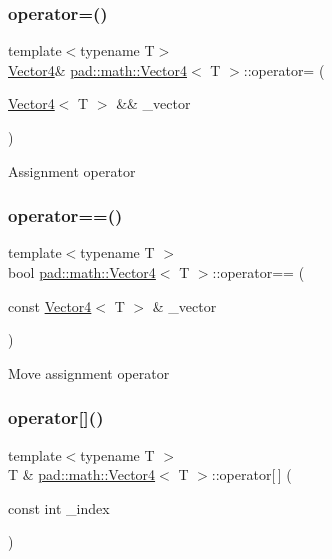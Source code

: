 \subsubsection{\texorpdfstring{operator=()}{operator=()}\hspace{0.1cm}{\footnotesize\ttfamily [3/3]}}
{\footnotesize\ttfamily template$<$typename T$>$ \\
\mbox{\hyperlink{structpad_1_1math_1_1_vector4}{Vector4}}\& \mbox{\hyperlink{structpad_1_1math_1_1_vector4}{pad\+::math\+::\+Vector4}}$<$ T $>$\+::operator= (\begin{DoxyParamCaption}\item[{\mbox{\hyperlink{structpad_1_1math_1_1_vector4}{Vector4}}$<$ T $>$ \&\&}]{\+\_\+vector }\end{DoxyParamCaption})\hspace{0.3cm}{\ttfamily [default]}}

Assignment operator \mbox{\label{structpad_1_1math_1_1_vector4_afe872f9553149f12674806bb6e7eb786}} 
\subsubsection{\texorpdfstring{operator==()}{operator==()}}
{\footnotesize\ttfamily template$<$typename T $>$ \\
bool \mbox{\hyperlink{structpad_1_1math_1_1_vector4}{pad\+::math\+::\+Vector4}}$<$ T $>$\+::operator== (\begin{DoxyParamCaption}\item[{const \mbox{\hyperlink{structpad_1_1math_1_1_vector4}{Vector4}}$<$ T $>$ \&}]{\+\_\+vector }\end{DoxyParamCaption})}

Move assignment operator \mbox{\label{structpad_1_1math_1_1_vector4_aaf150bc0a3a170ca7b8bde7892e20c66}} 
\subsubsection{\texorpdfstring{operator[]()}{operator[]()}}
{\footnotesize\ttfamily template$<$typename T $>$ \\
T \& \mbox{\hyperlink{structpad_1_1math_1_1_vector4}{pad\+::math\+::\+Vector4}}$<$ T $>$\+::operator\mbox{[}$\,$\mbox{]} (\begin{DoxyParamCaption}\item[{const int}]{\+\_\+index }\end{DoxyParamCaption})}

